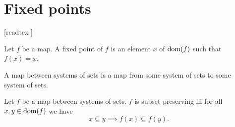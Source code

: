 \documentclass[../set-theory.tex]{subfiles}
\begin{document}
  \chapter{Fixed points}\label{fixed-points}


  \begin{forthel}

    [readtex ]

  \end{forthel}


  \begin{forthel}
    \begin{definition}
      Let $f$ be a map.
      A fixed point of $f$ is an element $x$ of $\operatorname{dom}(f)$ such that $f(x) = x$.
    \end{definition}
  \end{forthel}

  \begin{forthel}
    \begin{definition}
      A map between systems of sets is a map from some system of sets to some
      system of sets.
    \end{definition}
  \end{forthel}

  \begin{forthel}
    \begin{definition}
      Let $f$ be a map between systems of sets.
      $f$ is subset preserving iff for all $x, y \in \operatorname{dom}(f)$
      we have \[ x \subseteq y \implies f(x) \subseteq f(y). \]
    \end{definition}
  \end{forthel}
\end{document}
